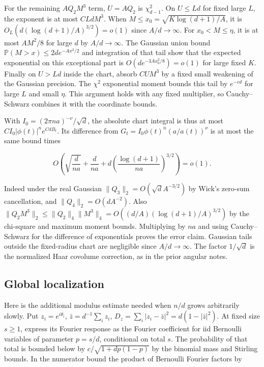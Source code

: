 For the remaining $A Q_2M^3$ term, $U=A Q_2$ is $\chi^2_{d-1}$. On $U\le Ld$ for fixed large $L$, the exponent is at most $CLd M^3$. When $M\le x_0=\sqrt{K\log(d+1)/A}$, it is $O_L(d(\log(d+1)/A)^{3/2})=o(1)$ since $A/d\to\infty$. For $x_0<M\le\eta$, it is at most $A M^2/8$ for large $d$ by $A/d\to\infty$. The Gaussian union bound $\mathbb P(M>x)\le2d e^{-A x^2/2}$ and integration of that tail show that the expected exponential on this exceptional part is $O(d e^{-3A x_0^2/8})=o(1)$ for large fixed $K$. Finally on $U>Ld$ inside the chart, absorb $CU M^3$ by a fixed small weakening of the Gaussian precision. The $\chi^2$ exponential moment bounds this tail by $e^{-cd}$ for large $L$ and small $\eta$. This argument holds with any fixed multiplier, so Cauchy--Schwarz combines it with the coordinate bounds.

With $I_0=(2\pi n a)^{-\nu}/\sqrt d$, the absolute chart integral is thus at most $C I_0|\phi(t)|^n e^{Cd B_t}$. Its difference from $G_t=I_0\phi(t)^n(a/a(t))^\nu$ is at most the same bound times

\begin{equation*}
O\!\left(\sqrt{\frac d{na}}+\frac d{na}
+d\left(\frac{\log(d+1)}{na}\right)^{3/2}\right)=o(1).
\end{equation*}

Indeed under the real Gaussian $\|Q_3\|_2=O(\sqrt d A^{-3/2})$ by Wick's zero-sum cancellation, and $\|Q_4\|_2=O(d A^{-2})$. Also $\|Q_2 M^3\|_2\le \|Q_2\|_4\|M^3\|_4=O((d/A)(\log(d+1)/A)^{3/2})$ by the chi-square and maximum moment bounds. Multiplying by $na$ and using Cauchy--Schwarz for the difference of exponentials proves the error claim. Gaussian tails outside the fixed-radius chart are negligible since $A/d\to\infty$. The factor $1/\sqrt d$ is the normalized Haar covolume correction, as in the prior angular notes.

\subsection{Global localization}

Here is the additional modulus estimate needed when $n/d$ grows arbitrarily slowly. Put $z_i=e^{i\theta_i}$, $\bar z=d^{-1}\sum_i z_i$, $D_z=\sum_i |z_i-\bar z|^2=d(1-|\bar z|^2)$. At fixed size $s\ge1$, express its Fourier response as the Fourier coefficient for iid Bernoulli variables of parameter $p=s/d$, conditional on total $s$. The probability of that total is bounded below by $c/\sqrt{1+d p(1-p)}$ by the binomial mass and Stirling bounds. In the numerator bound the product of Bernoulli Fourier factors by


